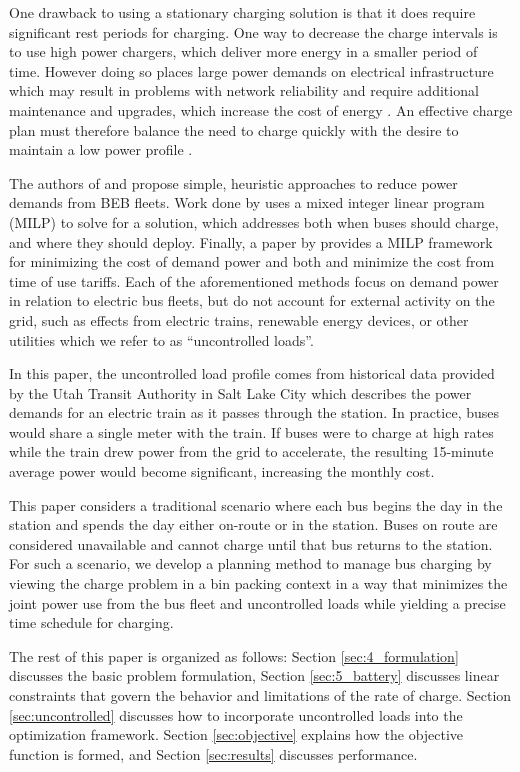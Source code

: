 \par One drawback to using a stationary charging solution is that it does require significant rest periods for charging. One way to decrease the charge intervals is to use high power chargers, which deliver more energy in a smaller period of time. However doing so places large power demands on electrical infrastructure \cite{stahleder_impact_2019} which may result in problems with network reliability \cite{deb_impact_2017} and require additional maintenance and upgrades, which increase the cost of energy \cite{boonraksa_impact_2019}. An effective charge plan must therefore balance the need to charge quickly with the desire to maintain a low power profile \cite{ojer_development_2020}.
\par The authors of \cite{qin_numerical_2016} and \cite{Wang2019} propose simple, heuristic approaches to reduce power demands from BEB fleets. Work done by \cite{bagherinezhad_spatio-temporal_2020} uses a mixed integer linear program (MILP) to solve for a solution, which addresses both when buses should charge, and where they should deploy. Finally, a paper by \cite{He_2019_Fast} provides a MILP framework for minimizing the cost of demand power and both \cite{He_2022_Battery} and \cite{Liu_2022_Optimal} minimize the cost from time of use tariffs. Each of the aforementioned methods focus on demand power in relation to electric bus fleets, but do not account for external activity on the grid, such as effects from electric trains, renewable energy devices, or other utilities which we refer to as ``uncontrolled loads''.  
\par In this paper, the uncontrolled load profile comes from historical data provided by the Utah Transit Authority in Salt Lake City which describes the power demands for an electric train as it passes through the station. In practice, buses would share a single meter with the train. If buses were to charge at high rates while the train drew power from the grid to accelerate, the resulting 15-minute average power would become significant, increasing the monthly cost. 
\par This paper considers a traditional scenario where each bus begins the day in the station and spends the day either on-route or in the station. Buses on route are considered unavailable and cannot charge until that bus returns to the station. For such a scenario, we develop a planning method to manage bus charging by viewing the charge problem in a bin packing context \cite{Ma_Mixed-integer_2017} in a way that minimizes the joint power use from the bus fleet and uncontrolled loads while yielding a precise time schedule for charging.
\par The rest of this paper is organized as follows: Section \ref{sec:4_formulation} discusses the basic problem formulation, Section \ref{sec:5_battery} discusses linear constraints that govern the behavior and limitations of the rate of charge. Section \ref{sec:uncontrolled} discusses how to incorporate uncontrolled loads into the optimization framework. Section \ref{sec:objective} explains how the objective function is formed, and Section \ref{sec:results} discusses performance.
